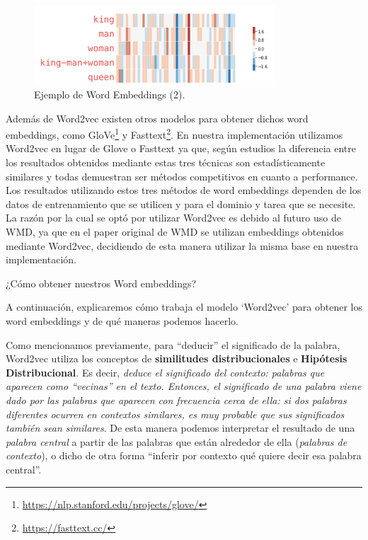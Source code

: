 \documentclass[12pt,a4paper]{article}
\makeatletter
\renewcommand\paragraph{\@startsection{paragraph}{4}{\z@}
            {-2.5ex\@plus -1ex \@minus -.25ex}
            {1.25ex \@plus .25ex}
            {\normalfont\normalsize\bfseries}}
\makeatother
\begin{document}
\begin{sloppypar}
\begin{figure}[H]    
 \centering
 \includegraphics[width=0.8\textwidth]{images/NLP/14.png}
 \caption{Ejemplo de Word Embeddings (2)\cite{datitos_nlp}.}
 \label{fig:Imagen_NLP_14}
\end{figure}

Además de Word2vec existen otros modelos para obtener dichos word embeddings, como GloVe\footnote{\url{https://nlp.stanford.edu/projects/glove/}} y Fasttext\footnote{\url{https://fasttext.cc/}}. En nuestra implementación utilizamos Word2vec en lugar de Glove o Fasttext ya que, según estudios\cite{NLP_12, NLP_13} la diferencia entre los resultados obtenidos mediante estas tres técnicas son estadísticamente similares y todas demuestran ser métodos competitivos en cuanto a performance. Los resultados utilizando estos tres métodos de word embeddings dependen de los datos de entrenamiento que se utilicen y para el dominio y tarea que se necesite. La razón por la cual se optó por utilizar Word2vec es debido al futuro uso de WMD, ya que en el paper original de WMD\cite{wmd_paper} se utilizan embeddings obtenidos mediante Word2vec, decidiendo de esta manera utilizar la misma base en nuestra implementación.

\cleardoublepage

\paragraph{¿Cómo obtener nuestros Word embeddings?}\label{obt_word_emb}

A continuación, explicaremos cómo trabaja el modelo ‘Word2vec’ para obtener los word embeddings y de qué maneras podemos hacerlo\cite{NLP_26}.

Como mencionamos previamente, para “deducir” el significado de la palabra, Word2vec utiliza los conceptos de \textbf{similitudes distribucionales} e \textbf{Hipótesis Distribucional}. Es decir, \textit{deduce el significado del contexto: palabras que aparecen como “vecinas” en el texto. Entonces, el significado de una palabra viene dado por las palabras que aparecen con frecuencia cerca de ella: si dos palabras diferentes ocurren en contextos similares, es muy probable que sus significados también sean similares}.  De esta manera podemos interpretar el resultado de una \textit{palabra central} a partir de las palabras que están alrededor de ella (\textit{palabras de contexto}), o dicho de otra forma “inferir por contexto qué quiere decir esa palabra central”. 


\end{sloppypar}
\end{document}
